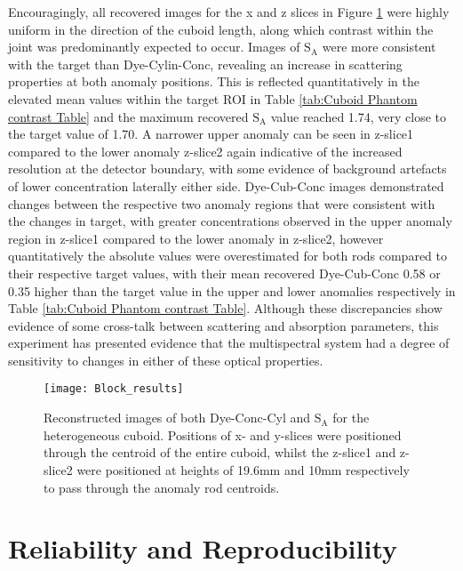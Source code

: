 \documentclass[twoside]{bhamthesis}
\theoremstyle{definition}
\begin{document}
Encouragingly, all recovered images for the x and z slices in Figure \ref{fig:Block_results} were highly uniform in the direction of the cuboid length, along which contrast within the joint was predominantly expected to occur. Images of $\mathrm{S_A}$ were more consistent with the target than Dye-Cylin-Conc, revealing an increase in scattering properties at both anomaly positions. This is reflected quantitatively in the elevated mean values within the target ROI in Table \ref{tab:Cuboid Phantom contrast Table} and the maximum recovered $\mathrm{S_A}$ value reached 1.74, very close to the target value of 1.70. A narrower upper anomaly can be seen in z-slice1 compared to the lower anomaly z-slice2 again indicative of the increased resolution at the detector boundary, with some evidence of background artefacts of lower concentration laterally either side. Dye-Cub-Conc images demonstrated changes between the respective two anomaly regions that were consistent with the changes in target, with greater concentrations observed in the upper anomaly region in z-slice1 compared to the lower anomaly in z-slice2, however quantitatively  the absolute values were overestimated for both rods compared to their respective target values, with their mean recovered Dye-Cub-Conc 0.58 or 0.35 higher than the target value in the upper and lower anomalies respectively in Table \ref{tab:Cuboid Phantom contrast Table}. Although these discrepancies show evidence of some cross-talk between scattering and absorption parameters, this experiment has presented evidence that the multispectral system had a degree of sensitivity to changes in either of these optical properties.

\begin{figure}[!ht]
\texttt{[image: Block\_results]}
\centering
\caption{Reconstructed images of both Dye-Conc-Cyl and $\mathrm{S_A}$ for the heterogeneous cuboid. Positions of x- and y-slices were positioned through the centroid of the entire cuboid, whilst the z-slice1 and z-slice2 were positioned at heights of 19.6mm and 10mm respectively to pass through the anomaly rod centroids.}
\label{fig:Block_results}
\end{figure}

\section{Reliability and Reproducibility}
\end{document}
